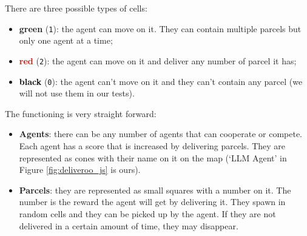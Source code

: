 There are three possible types of cells:
\begin{itemize}
  \item \textcolor{primary}{\textbf{green}} (\texttt{1}): the agent can move on
    it. They can contain multiple parcels but only one agent at a time;

  \item \textcolor{red}{\textbf{red}} (\texttt{2}): the agent can move on it and
    deliver any number of parcel it has;

  \item \textcolor{black}{\textbf{black}} (\texttt{0}): the agent can't move on
    it and they can't contain any parcel (we will not use them in our tests).
\end{itemize}

The functioning is very straight forward:

\begin{itemize}
  \item \textbf{Agents}: there can be any number of agents that can cooperate or
    compete. Each agent has a score that is increased by delivering parcels. They
    are represented as cones with their name on it on the map (`LLM Agent' in
    Figure \ref{fig:deliveroo_js} is ours).

  \item \textbf{Parcels}: they are represented as small squares with a number on
    it. The number is the reward the agent will get by delivering it. They spawn
    in random cells and they can be picked up by the agent. If they are not
    delivered in a certain amount of time, they may disappear.
\end{itemize}


